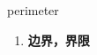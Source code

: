 
\begin{frame}
{\huge perimeter}
\begin{center}
\begin{enumerate}\Large
  \item \textbf{边界，界限}
\end{enumerate}
\end{center}
\end{frame}
